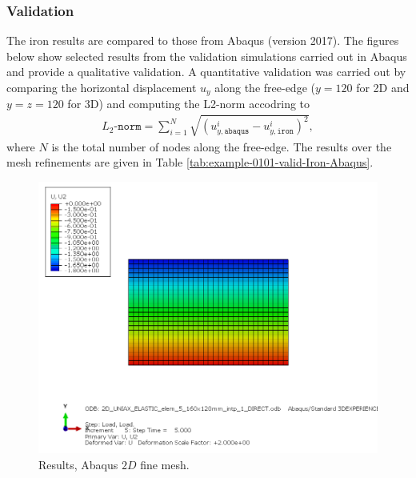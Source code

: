 \subsubsection{Validation}
%
The iron results are compared to those from Abaqus (version 2017). The figures below show selected results from the validation simulations carried out in Abaqus and provide a qualitative validation. A quantitative validation was carried out by comparing the horizontal displacement $u_y$ along the free-edge ($y=120$ for 2D and $y=z=120$ for 3D) and computing the L2-norm accodring to
\begin{align}
    L_2\texttt{-norm} = \sum_{i=1}^{N} \sqrt{\left(u_{y,\texttt{abaqus}}^i-u_{y,\texttt{iron}}^i  \right)^2},
\end{align}
where $N$ is the total number of nodes along the free-edge. The results over the mesh refinements are given in Table \ref{tab:example-0101-valid-Iron-Abaqus}.
%
\begin{figure}[h!]
    \centering 
    \includegraphics[width=\columnwidth]{examples/example-0101/doc/figures/2D_UNIAX_ELASTIC_elem_5_160x120mm_intp_1_DIRECTU2.png} 
    \caption{Results, Abaqus $2D$ fine mesh.}
    \label{example-0101-abaqus-2D-fig}
\end{figure}
%
